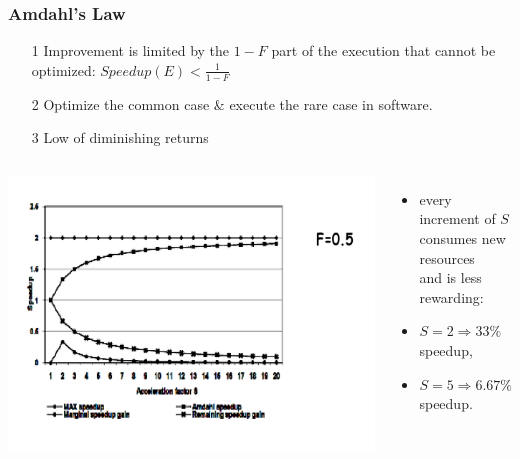 \documentclass{beamer}
\begin{document}
\begin{frame}[fragile,t]
\frametitle{Amdahl's Law}

\begin{itemize}
    \item[1] Improvement is limited by the $1-F$ part of the execution 
                that cannot be optimized:
                $Speedup(E) < \frac{1}{1-F}$\medskip

    \item[2] Optimize the common case \& execute the rare case in software.

    \item[3] Low of diminishing returns\smallskip

\end{itemize}

\vspace{-4ex}
\begin{columns}
\includegraphics[width=55ex]{Figures/L1/AmdhalDimRet}\pause
{}\vspace{-3ex}
\begin{itemize}
    \item every increment of $S$\\ consumes new resources\\
            and is less rewarding: 
    \item $S = 2 \Rightarrow 33\%$ speedup,
    \item $S = 5 \Rightarrow 6.67\%$ speedup.
\end{itemize}
\end{columns}

\end{frame}
\end{document}
